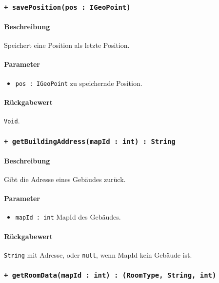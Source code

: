 \subsubsection*{\texttt{+ savePosition(pos : IGeoPoint)}}\label{App_Map_Model_savePosition_IMap}%
\paragraph*{Beschreibung}
Speichert eine Position als letzte Position.
\paragraph*{Parameter}
\begin{itemize}
    \item \texttt{pos : IGeoPoint} zu speichernde Position.
\end{itemize}
\paragraph*{Rückgabewert}
\texttt{Void}.

\subsubsection*{\texttt{+ getBuildingAddress(mapId : int) : String}}\label{App_Map_Model_getBuildingAddress_IMap}%
\paragraph*{Beschreibung}
Gibt die Adresse eines Gebäudes zurück.
\paragraph*{Parameter}
\begin{itemize}
    \item \texttt{mapId : int} MapId des Gebäudes.
\end{itemize}
\paragraph*{Rückgabewert}
\texttt{String} mit Adresse, oder \texttt{null}, wenn MapId kein Gebäude ist.

\subsubsection*{\texttt{+ getRoomData(mapId : int) : (RoomType, String, int)}}\label{App_Map_Model_getRoomData_IMap}%
